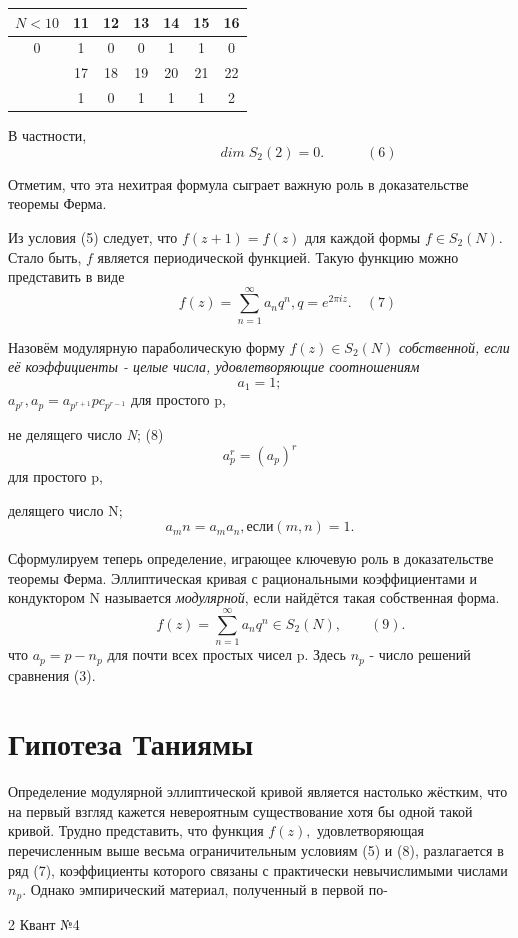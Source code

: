 \begin{multicols}{3}
\begin{center}
\begin{tabular}{|c|c|c|c|c|c|c|}
\hline
$N<10$ & 11 & 12 & 13 & 14 & 15 & 16 \\ \hline
0 & 1 & 0 & 0 & 1 & 1 & 0 \\ \hline
\multirow{3}{*}{ \qquad } & 17 & 18 & 19 & 20 & 21 & 22 \\
\cline{2-7}
            & 1 & 0 & 1 & 1 & 1 & 2 \\
\hline
\end{tabular}
\end{center}
 \par В частности, \[ \qquad \qquad \qquad \quad dim \; S_2(2) = 0. \qquad \quad (6)\] \par Отметим, что эта нехитрая формула сыграет важную роль в доказательстве теоремы Ферма. \par Из условия (5) следует, что $f(z + 1) = f(z)$ для каждой формы $f \in S_2(N).$ Стало быть, $f$ является периодической функцией. Такую функцию можно представить в виде \[\qquad \qquad f(z) = \sum_{n=1}^{\infty} a_n q^n, q = e^{2\pi i z}.  \quad (7)\] \par Назовём модулярную параболическую форму $f(z) \in S_2(N)$ \textit{собственной, если её коэффициенты - целые числа, удовлетворяющие соотношениям} \[a_1 
 = 1; \] $a_{p^r},a_p = a_{p^{r+1}}pc_{p^{r-1}}$ для простого p,\par \qquad  \qquad  не делящего число \textit{N}; \:\: (8) \[a_p^r=(a_p)^r\] \qquad \qquad для простого p, \par \qquad \qquad \qquad \quad делящего число N; \[a_mn=a_ma_n, если (m, n) = 1.\] \par Сформулируем теперь определение, играющее ключевую роль в доказательстве теоремы Ферма. Эллиптическая кривая с рациональными коэффициентами и кондуктором N называется \textit{модулярной}, если найдётся такая собственная форма. \[ \qquad \quad f(z) = \sum_{n=1}^{\infty} a_n q^n \in S_2(N), \qquad (9).\] что $a_p = p - n_p$ для почти всех простых чисел p. Здесь $n_p$ - число решений сравнения (3). \section*{\qquad Гипотеза Таниямы} Определение модулярной эллиптической кривой является настолько жёстким, что на первый взгляд кажется невероятным существование хотя бы одной такой кривой. Трудно представить, что функция $f(z),$ удовлетворяющая перечисленным выше весьма ограничительным условиям (5) и (8), разлагается в ряд (7), коэффициенты которого связаны с практически невычислимыми числами $n_p$. Однако эмпирический материал, полученный в первой по-
\end{multicols}
\scriptsize{2 Квант №4}
%
